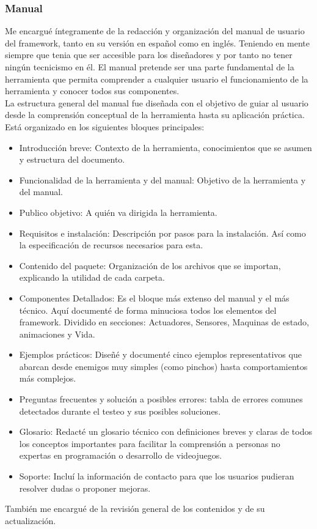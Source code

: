 \subsubsection{Manual}
Me encargué íntegramente de la redacción y organización del manual de usuario del framework, tanto en su versión en español como en inglés. Teniendo en mente siempre que tenia que ser accesible para los diseñadores y por tanto no tener ningún tecnicismo en él. El manual pretende ser una parte fundamental de la herramienta que permita comprender a cualquier usuario el funcionamiento de la herramienta y conocer todos sus componentes. \\
La estructura general del manual fue diseñada con el objetivo de guiar al usuario desde la comprensión conceptual de la herramienta hasta su aplicación práctica. Está organizado en los siguientes bloques principales:
 \begin{itemize}
    \item Introducción breve: Contexto de la herramienta, conocimientos que se asumen y estructura del documento.
    \item Funcionalidad de la herramienta y del manual:  Objetivo de la herramienta y del manual.
    \item Publico objetivo: A quién va dirigida la herramienta.
    \item Requisitos e instalación: Descripción por pasos para la instalación. Así como la especificación de recursos necesarios  para esta.
    \item Contenido del paquete: Organización de los archivos que se importan, explicando la utilidad de cada carpeta.
    \item Componentes Detallados: Es el bloque más extenso del manual y el más técnico. Aquí documenté de forma minuciosa todos los elementos del framework. Dividido en secciones: Actuadores, Sensores, Maquinas de estado, animaciones y Vida.
    \item Ejemplos prácticos: Diseñé y documenté cinco ejemplos representativos que abarcan desde enemigos muy simples (como pinchos) hasta comportamientos más complejos.
    \item Preguntas frecuentes y solución a posibles errores: tabla de errores comunes detectados durante el testeo y sus posibles soluciones.
    \item Glosario: Redacté un glosario técnico con definiciones breves y claras de todos los conceptos importantes para facilitar la comprensión a personas no expertas en programación o desarrollo de videojuegos.
    \item Soporte: Incluí la información de contacto para que los usuarios pudieran resolver dudas o proponer mejoras.
  \end{itemize}
También me encargué de la revisión general de los contenidos y de su actualización.


